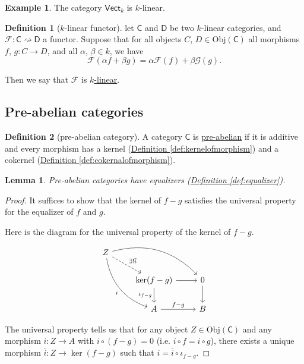 \documentclass[a4paper]{report}
\newcommand{\defn}[1]{\ul{#1}}
\newcommand{\Obj}{\mathrm{Obj}}
\theoremstyle{definition}
\newtheorem{definition}{Definition}[section]
\newtheorem{example}{Example}[section]
\theoremstyle{plain}
\newtheorem{lemma}{Lemma}[section]
\theoremstyle{remark}
\begin{document}
\begin{example}
  The category $\mathsf{Vect}_{k}$ is $k$-linear.
\end{example}

\begin{definition}[$k$-linear functor]
  \label{def:linearfunctor}
  let $\mathsf{C}$ and $\mathsf{D}$ be two $k$-linear categories, and $\mathcal{F}\colon \mathsf{C} \rightsquigarrow \mathsf{D}$ a functor. Suppose that for all objects $C$, $D \in \Obj(\mathsf{C})$ all morphisms $f$, $g\colon C \to D$, and all $\alpha$, $\beta \in k$, we have
  \begin{equation*}
    \mathcal{F}(\alpha f + \beta g) = \alpha \mathcal{F}(f) + \beta \mathcal{G}(g).
  \end{equation*}

  Then we say that $\mathcal{F}$ is \defn{$k$-linear}.
\end{definition}

\subsection{Pre-abelian categories} \label{sec:preabeliancategories}
\begin{definition}[pre-abelian category]
  \label{def:preabeliancategory}
  A category  $\mathsf{C}$ is \defn{pre-abelian} if it is additive and every morphism has a kernel (\hyperref[def:kernelofmorphism]{Definition \ref*{def:kernelofmorphism}}) and a cokernel (\hyperref[def:cokernalofmorphism]{Definition \ref*{def:cokernalofmorphism}}).
\end{definition}

\begin{lemma}
  \label{lemma:preabeliancategorieshaveequalizers}
  Pre-abelian categories have equalizers (\hyperref[def:equalizer]{Definition \ref*{def:equalizer}}).
\end{lemma}
\begin{proof}
  It suffices to show that the kernel of $f - g$ satisfies the universal property for the equalizer of $f$ and $g$.

  Here is the diagram for the universal property of the kernel of $f - g$.
  \begin{equation*}
    \begin{tikzcd}
      Z
      \arrow[rrd, bend left]
      \arrow[ddr, bend right, swap, "i"]
      \arrow[dr, dashed, "\exists!\bar{i}"]
      \\
      & \ker(f - g)
      \arrow[d, swap, "\iota_{f - g}"]
      \arrow[r]
      & 0
      \arrow[d]
      \\
      & A
      \arrow[r, "f - g"]
      & B
    \end{tikzcd}
  \end{equation*}

  The universal property tells us that for any object $Z \in \Obj(\mathsf{C})$ and any morphism $i\colon Z \to A$ with $i \circ (f - g) = 0$ (i.e. $i \circ f = i \circ g$), there exists a unique morphism $\bar{i}\colon Z \to \ker(f - g)$ such that $i = \bar{i} \circ \iota_{f - g}$.
\end{proof}
\end{document}
